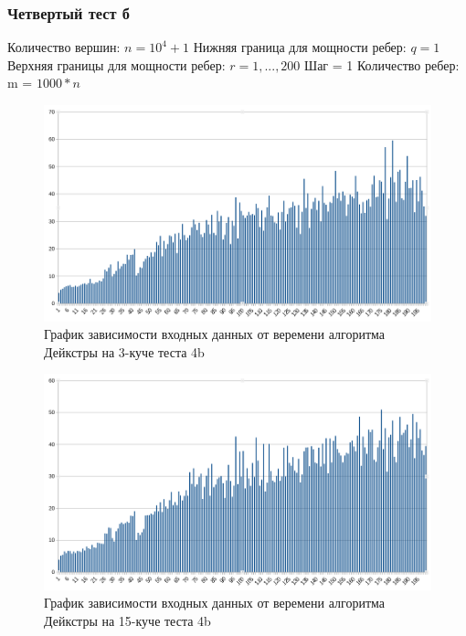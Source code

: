 \documentclass[a4paper, 12pt]{article}
\theoremstyle{definition}
\begin{document}
	\subsubsection{Четвертый тест б}
	Количество вершин: $n = 10^4+1$ \newline
	Нижняя граница для мощности ребер: $q = 1$ \newline
	Верхняя границы для мощности ребер: $r = 1,...,200$ \newline
	Шаг = 1 \newline
	Количество ребер: m = $1000*n$
	\begin{figure}[!ht]
		\centering
		\includegraphics[width=1\textwidth]{img/res4b_3.png}
		\caption{График зависимости входных данных от веремени алгоритма Дейкстры на 3-куче теста 4b}
		\label{fig:my_image}
	\end{figure}
	
	\begin{figure}[!ht]
		\centering
		\includegraphics[width=1\textwidth]{img/res4b_15.png}
		\caption{График зависимости входных данных от веремени алгоритма Дейкстры на 15-куче теста 4b}
		\label{fig:my_image}
	\end{figure}
	
\end{document}
